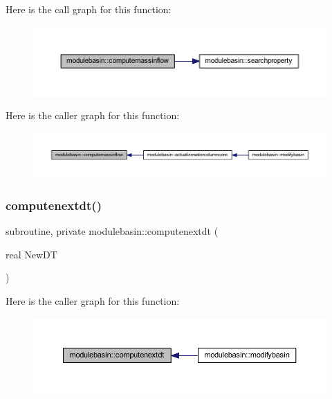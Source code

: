 Here is the call graph for this function\+:\nopagebreak
\begin{figure}[H]
\begin{center}
\leavevmode
\includegraphics[width=350pt]{namespacemodulebasin_a106653309e017391895ef068b14bfdc2_cgraph}
\end{center}
\end{figure}
Here is the caller graph for this function\+:\nopagebreak
\begin{figure}[H]
\begin{center}
\leavevmode
\includegraphics[width=350pt]{namespacemodulebasin_a106653309e017391895ef068b14bfdc2_icgraph}
\end{center}
\end{figure}
\mbox{\label{namespacemodulebasin_a3f14e909944d51caacaf3104b755d817}} 
\subsubsection{\texorpdfstring{computenextdt()}{computenextdt()}}
{\footnotesize\ttfamily subroutine, private modulebasin\+::computenextdt (\begin{DoxyParamCaption}\item[{real}]{New\+DT }\end{DoxyParamCaption})\hspace{0.3cm}{\ttfamily [private]}}

Here is the caller graph for this function\+:\nopagebreak
\begin{figure}[H]
\begin{center}
\leavevmode
\includegraphics[width=350pt]{namespacemodulebasin_a3f14e909944d51caacaf3104b755d817_icgraph}
\end{center}
\end{figure}
\mbox{\label{namespacemodulebasin_a65271cf9b17250a778002a527ee4c253}} 
